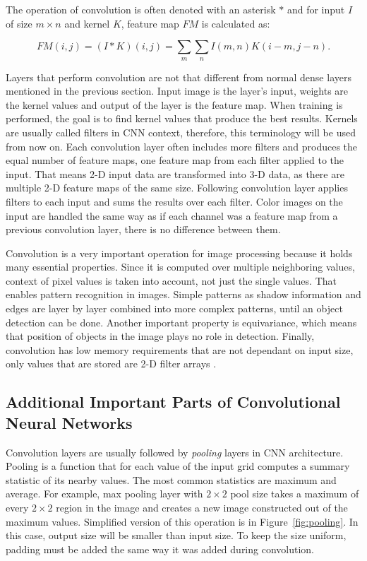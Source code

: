 The operation of convolution is often denoted with an asterisk $*$ and for input $I$ of size $m \times n$ and kernel $K$, feature map $FM$ is calculated as:

\begin{equation}
    FM(i, j) = (I * K)(i, j) = \sum\limits_m \sum\limits_n I(m, n) K(i-m, j-n).
\end{equation}

Layers that perform convolution are not that different from normal dense layers mentioned in the previous section. Input image is the layer's input, weights are the kernel values and output of the layer is the feature map. When training is performed, the goal is to find kernel values that produce the best results. Kernels are usually called filters in CNN context, therefore, this terminology will be used from now on. Each convolution layer often includes more filters and produces the equal number of feature maps, one feature map from each filter applied to the input. That means 2-D input data are transformed into 3-D data, as there are multiple 2-D feature maps of the same size. Following convolution layer applies filters to each input and sums the results over each filter. Color images on the input are handled the same way as if each channel was a feature map from a previous convolution layer, there is no difference between them.

Convolution is a very important operation for image processing because it holds many essential properties. Since it is computed over multiple neighboring values, context of pixel values is taken into account, not just the single values. That enables pattern recognition in images. Simple patterns as shadow information and edges are layer by layer combined into more complex patterns, until an object detection can be done. Another important property is equivariance, which means that position of objects in the image plays no role in detection. Finally, convolution has low memory requirements that are not dependant on input size, only values that are stored are 2-D filter arrays \cite{Goodfellow-et-al-2016}.

\subsection{\label{sec:other-cnn-ops}Additional Important Parts of Convolutional Neural Networks}

Convolution layers are usually followed by \textit{pooling} layers in CNN architecture. Pooling is a function that for each value of the input grid computes a summary statistic of its nearby values. The most common statistics are maximum and average. For example, max pooling layer with $2 \times 2$ pool size takes a maximum of every $2 \times 2$ region in the image and creates a new image constructed out of the maximum values. Simplified version of this operation is in Figure~\ref{fig:pooling}. In this case, output size will be smaller than input size. To keep the size uniform, padding must be added the same way it was added during convolution.

